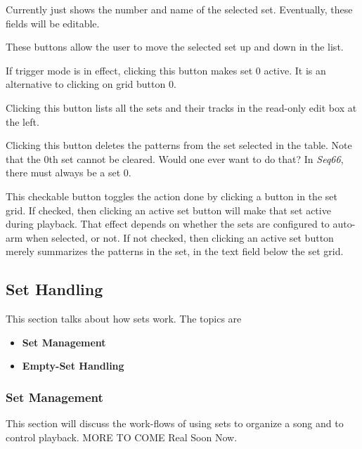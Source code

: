    Currently just shows the number and name of the selected set.
   Eventually, these fields will be editable.

   These buttons allow the user to move the selected set up and down
   in the list.

   If trigger mode is in effect, clicking this button makes
   set 0 active.
   It is an alternative to clicking on grid button 0.

   Clicking this button lists all the sets and their tracks in the
   read-only edit box at the left.

   Clicking this button deletes the patterns from the 
   set selected in the table.
   Note that the 0th set cannot be cleared.
   Would one ever want to do that?
   In \textsl{Seq66}, there must always be a set 0.

   This checkable button toggles the action done by clicking a button
   in the set grid.
   If checked, then clicking an active set button will make that
   set active during playback.
   That effect depends on whether the sets are configured to auto-arm when
   selected, or not.
   If not checked, then clicking an active set button merely summarizes the
   patterns in the set, in the text field below the set grid.

\subsection{Set Handling}
\label{subsec:setmaster_handling}

   This section talks about how sets work.  The topics are

   \begin{itemize}
      \item \textbf{Set Management}
      \item \textbf{Empty-Set Handling}
   \end{itemize}

\subsubsection{Set Management}
\label{subsubsec:setmaster_management}

   This section will discuss the work-flows of using sets to organize a song
   and to control playback.  MORE TO COME Real Soon Now.

